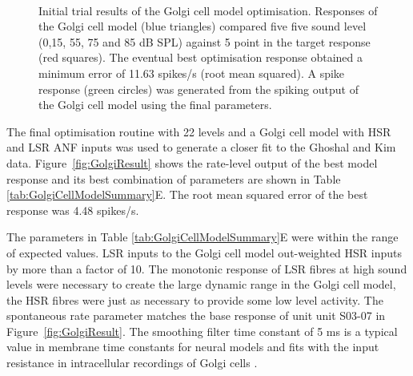 \begin{figure}[htb]
  \centering
  \\
  \caption{Initial trial results of the Golgi cell model optimisation.
    Responses of the Golgi cell model (blue triangles) compared five five sound
    level (0,15, 55, 75 and 85 dB SPL) against 5 point in the target response
    (red squares). The eventual best optimisation response obtained a minimum
    error of 11.63 spikes/s (root mean squared). A spike response (green
    circles) was generated from the spiking output of the Golgi cell model using
    the final parameters.  }\label{fig:GolgiTestResult}
\end{figure}

The final optimisation routine with 22 levels and a Golgi cell model with HSR
and LSR ANF inputs was used to generate a closer fit to the Ghoshal and Kim
data. Figure~\ref{fig:GolgiResult} shows the rate-level output of the best model
response and its best combination of parameters are shown in Table
\ref{tab:GolgiCellModelSummary}E. The root mean squared error of the best
response was 4.48 spikes/s.

The parameters in Table \ref{tab:GolgiCellModelSummary}E were within the range
of expected values. LSR inputs to the Golgi cell model out-weighted HSR inputs
by more than a factor of 10. The monotonic response of LSR fibres at high sound
levels were necessary to create the large dynamic range in the Golgi cell model,
the HSR fibres were just as necessary to provide some low level activity. The
spontaneous rate parameter matches the base response of unit unit S03-07 in
Figure~\ref{fig:GolgiResult}. The smoothing filter time constant of 5 ms is a
typical value in membrane time constants for neural models and fits with the
input resistance in intracellular recordings of Golgi cells
\citep{FerragamoGoldingEtAl:1998}. 


